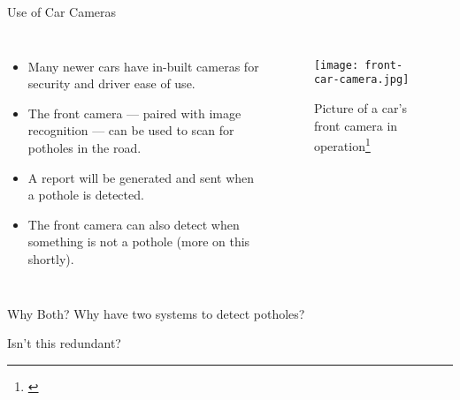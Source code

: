 \documentclass{beamer}
\begin{document}
\begin{frame}{Use of Car Cameras}
    \begin{columns}

        \begin{itemize}
            \item Many newer cars have in-built cameras for security and driver ease of use.
            \item The front camera --- paired with image recognition --- can be used to scan for potholes in the road.
            \item A report will be generated and sent when a pothole is detected.
            \item The front camera can also detect when something is \alert{not} a pothole (more on this shortly).
        \end{itemize}


        \begin{figure}
            \texttt{[image: front-car-camera.jpg]}
            \caption{Picture of a car's front camera in operation\footnote[frame]{\cite{front-camera-picture}}}
        \end{figure}
    \end{columns}
\end{frame}

\begin{frame}{Why Both?}
    Why have two systems to detect potholes?

    Isn't this redundant?
\end{frame}
\end{document}
